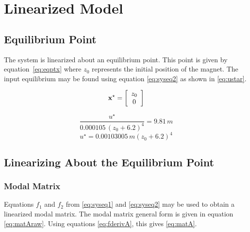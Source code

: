 \chapter{Linearized Model} 




\section{Equilibrium Point}

The system is linearized about an equilibrium point.
This point is given by equation\ \ref{eq:eqptx} where $z_0$ represents the initial position of the magnet. %
The input equilibrium may be found using equation \ref{eq:syseq2} as shown in \ref{eq:ustar}.

\begin{equation}
	\label{eq:eqptx}
	{\bf x^\star} = 
	\left[
		\begin{array}{c}
			z_{0} \\
			0 \\
		\end{array}
	\right]
\end{equation}

\vspace{6pt}

\begin{equation}
	{\frac {u^\star}{0.000105\,\left(z_0 + 6.2 \right) ^{4}}} = 9.81\,m
\end{equation}
\begin{equation}
	\label{eq:ustar}
	u^\star =  0.00103005\,m \left( z_0 + 6.2 \right) ^{4}
\end{equation}

\section{Linearizing About the Equilibrium Point}

\subsection{Modal Matrix}

Equations $f_1$ and $f_2$ from \ref{eq:syseq1} and \ref{eq:syseq2} may be used to obtain a linearized modal matrix.
The modal matrix general form is given in equation \ref{eq:matAraw}.
Using equations \ref{eq:fderivA}, this gives \ref{eq:matA}.

